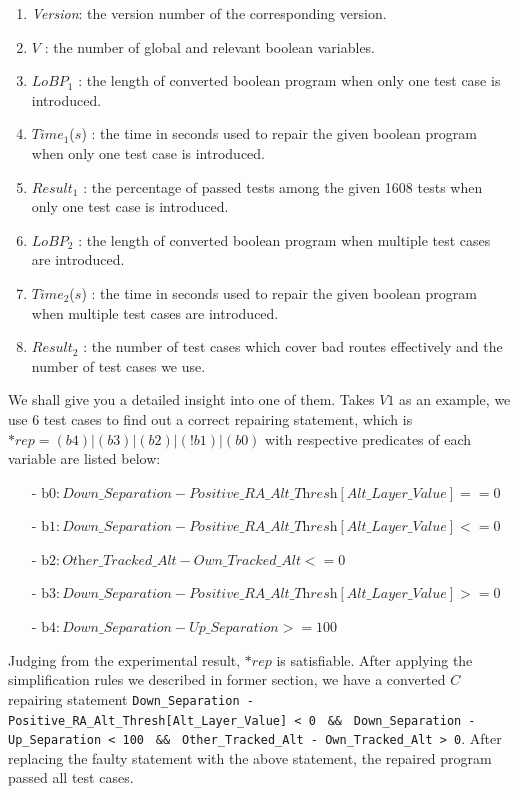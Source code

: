 \documentclass[10pt,journal,final,]{article}
\theoremstyle{definition}
\begin{document}
\begin{enumerate}
\item {\it Version}: the version number of the corresponding version.
\item $V$             : the number of global and relevant boolean variables.
\item $LoBP_{1}$      : the length of converted boolean program when only one test case is introduced.
\item $Time_{1}$($s$) : the time in seconds used to repair the given boolean program when only one test case is introduced.
\item $Result_{1}$    : the percentage of passed tests among the given 1608 tests when only one test case is introduced.
\item $LoBP_{2}$      : the length of converted boolean program when multiple test cases are introduced.
\item $Time_{2}$($s$) : the time in seconds used to repair the given boolean program when multiple test cases are introduced.
\item $Result_{2}$    : the number of test cases which cover bad routes effectively and the number of test cases we use.
\end{enumerate}

We shall give you a detailed insight into one of them.
Takes $V1$ as an example, we use 6 test cases to find out a correct repairing statement, which is $*rep=(b4)|(b3)|(b2)|(!b1)|(b0)$ with respective predicates of each variable are listed below:

\begin{itemize}
\item[-] $\text{b0} : \textit{Down\_Separation} - \textit{Positive\_RA\_Alt\_Thresh}[\textit{Alt\_Layer\_Value}] == 0$
\item[-] $\text{b1} : \textit{Down\_Separation} - \textit{Positive\_RA\_Alt\_Thresh}[\textit{Alt\_Layer\_Value}] <= 0$
\item[-] $\text{b2} : \textit{Other\_Tracked\_Alt} - \textit{Own\_Tracked\_Alt} <= 0$
\item[-] $\text{b3} : \textit{Down\_Separation} - \textit{Positive\_RA\_Alt\_Thresh}[\textit{Alt\_Layer\_Value}] >= 0$
\item[-] $\text{b4} : \textit{Down\_Separation} - \textit{Up\_Separation} >= 100$
\end{itemize}

Judging from the experimental result, $*rep$ is satisfiable. After applying the simplification rules we described in former section,
we have a converted $C$ repairing statement \lstinline|Down_Separation - Positive_RA_Alt_Thresh[Alt_Layer_Value] < 0| \lstinline| && | \lstinline|Down_Separation - Up_Separation < 100| \lstinline| && | \lstinline|Other_Tracked_Alt - Own_Tracked_Alt > 0|.
After replacing the faulty statement with the above statement, the repaired program passed all test cases.
\end{document}
